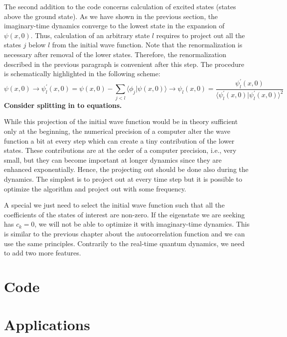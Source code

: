 The second addition to the code concerns calculation of excited states (states above the ground state). As we have shown in the previous section, the imaginary-time dynamics converge to the lowest state in the expansion of $\psi(x,0)$. Thus, calculation of an arbitrary state $l$ requires to project out all the states $j$ below $l$ from the initial wave function. Note that the renormalization is necessary after removal of the lower states. Therefore, the renormalization described in the previous paragraph is convenient after this step. The procedure is schematically highlighted in the following scheme:
\begin{equation}
    \psi(x,0) \rightarrow \psi^\prime_l(x,0) = \psi(x,0) - \sum_{j<l}\langle \phi_j | \psi(x,0) \rangle \rightarrow \psi_l(x,0) = \frac{\psi^\prime_l(x,0)}{\langle \psi^\prime_l(x,0) | \psi^\prime_l(x,0) \rangle^2} 
\end{equation}
\textbf{Consider splitting in to equations.}

While this projection of the initial wave function would be in theory sufficient only at the beginning, the numerical precision of a computer alter the wave function a bit at every step which can create a tiny contribution of the lower states. These contributions are at the order of a computer precision, i.e., very small, but they can become important at longer dynamics since they are enhanced exponentially. Hence, the projecting out should be done also during the dynamics. The simplest is to project out at every time step but it is possible to optimize the algorithm and project out with some frequency.

A special  we just need to select the initial wave function such that all the coefficients of the states of interest are non-zero. If the eigenstate we are seeking has $c_k=0$, we will not be able to optimize it with imaginary-time dynamics. This is similar to the previous chapter about the autocorrelation function and we can use the same principles. Contrarily to the real-time quantum dynamics, we need to add two more features.

\section{Code}

\lstset{style=mystyle}


\section{Applications}

